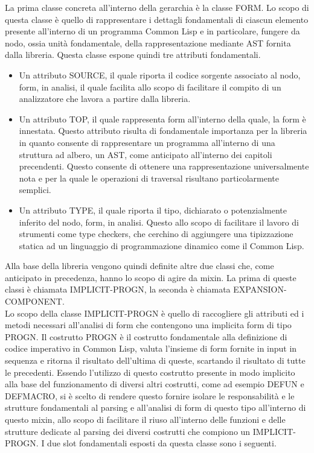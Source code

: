 La prima classe concreta all’interno della gerarchia è la classe FORM. Lo
scopo di questa classe è quello di rappresentare i dettagli fondamentali di
ciascun elemento presente all’interno di un programma Common Lisp e in
particolare, fungere da nodo, ossia unità fondamentale, della rappresentazione
mediante AST fornita dalla libreria. Questa classe espone quindi tre attributi
fondamentali.\\

\begin{itemize}

\item Un attributo SOURCE, il quale riporta il codice sorgente associato al
nodo, form, in analisi, il quale facilita allo scopo di facilitare il compito
di un analizzatore che lavora a partire dalla libreria.

\item Un attributo TOP,  il quale rappresenta form all’interno della quale, la
form è innestata. Questo attributo risulta di fondamentale importanza per la
libreria in quanto consente di rappresentare un programma all’interno di una
struttura ad albero, un AST, come anticipato all’interno dei capitoli
precendenti. Questo consente di ottenere una rappresentazione universalmente
nota e per la quale le operazioni di traversal risultano particolarmente
semplici.

\item Un attributo TYPE, il quale riporta il tipo, dichiarato o potenzialmente
inferito del nodo, form, in analisi. Questo allo scopo di facilitare il lavoro
di strumenti come type checkers, che cerchino di aggiungere una tipizzazione
statica ad un linguaggio di programmazione dinamico come il Common Lisp.\\

\end{itemize}

Alla base della libreria vengono quindi definite altre due classi che, come
anticipato in precedenza, hanno lo scopo di agire da mixin. La prima di queste
classi è chiamata IMPLICIT-PROGN, la seconda è chiamata EXPANSION-COMPONENT.\\

Lo scopo della classe IMPLICIT-PROGN è quello di raccogliere gli attributi ed
i metodi necessari all’analisi di form che contengono una implicita form di
tipo PROGN. Il costrutto PROGN è il costrutto fondamentale alla definizione di
codice imperativo in Common Lisp, valuta l’insieme di form fornite in input in
sequenza e ritorna il risultato dell’ultima di queste, scartando il risultato
di tutte le precedenti. Essendo l’utilizzo di questo costrutto presente in
modo implicito alla base del funzionamento di diversi altri costrutti, come ad
esempio DEFUN e DEFMACRO, si è scelto di rendere questo fornire isolare le
responsabilità e le strutture fondamentali al parsing e all’analisi di form di
questo tipo all’interno di questo mixin, allo scopo di facilitare il riuso
all’interno delle funzioni e delle strutture dedicate al parsing dei diversi
costrutti che compiono un IMPLICIT-PROGN. I due slot fondamentali esposti da
questa classe sono i seguenti.\\

